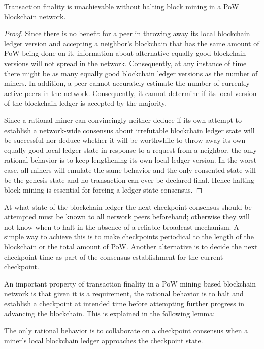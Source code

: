 \begin{lemma}
\label{l-halt}
Transaction finality is unachievable without halting block mining in a PoW blockchain network.  
\end{lemma}

\begin{proof}
Since there is no benefit for a peer in throwing away its local blockchain ledger version and accepting a neighbor's blockchain that has the same amount of PoW being done on it, information about alternative equally good blockchain versions will not spread in the network. Consequently, at any instance of time there might be as many equally good blockchain ledger versions as the number of miners. In addition, a peer cannot accurately estimate the number of currently active peers in the network. Consequently, it cannot determine if its local version of the blockchain ledger is accepted by the majority. 

Since a rational miner can convincingly neither deduce if its own attempt to establish a network-wide consensus about irrefutable blockchain ledger state will be successful nor deduce whether it will be worthwhile to throw away its own equally good local ledger state in response to a request from a neighbor, the only rational behavior is to keep lengthening its own local ledger version. In the worst case, all miners will emulate the same behavior and the only consented state will be the genesis state and no transaction can ever be declared final. Hence halting block mining is essential for forcing a ledger state consensus.             
\end{proof}                

At what state of the blockchain ledger the next checkpoint consensus should be attempted must be known to all network peers beforehand; otherwise they will not know when to halt in the absence of a reliable broadcast mechanism. A simple way to achieve this is to make checkpoints periodical to the length of the blockchain or the total amount of PoW. Another alternative is to decide the next checkpoint time as part of the consensus establishment for the current checkpoint.    

An important property of transaction finality in a PoW mining based blockchain network is that given it is a requirement, the rational behavior is to halt and establish a checkpoint at intended time before attempting further progress in advancing the blockchain. This is explained in the following lemma:

\begin{lemma}
\label{l-rationality}
The only rational behavior is to collaborate on a checkpoint consensus when a miner's local blockchain ledger approaches the checkpoint state.       
\end{lemma}

